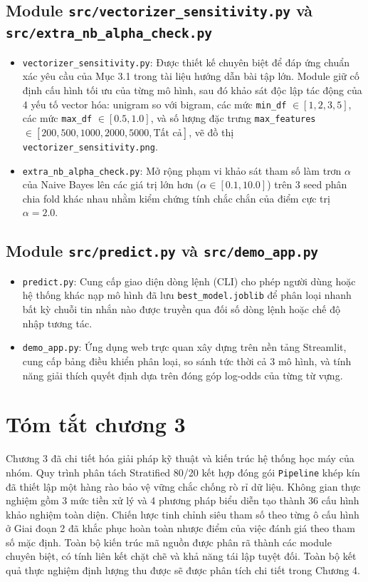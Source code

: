 \subsection{Module \texttt{src/vectorizer\_sensitivity.py} và \texttt{src/extra\_nb\_alpha\_check.py}}
\begin{itemize}
    \item \texttt{vectorizer\_sensitivity.py}: Được thiết kế chuyên biệt để đáp ứng chuẩn xác yêu cầu của Mục 3.1 trong tài liệu hướng dẫn bài tập lớn. Module giữ cố định cấu hình tối ưu của từng mô hình, sau đó khảo sát độc lập tác động của 4 yếu tố vector hóa: unigram so với bigram, các mức \texttt{min\_df} $\in [1, 2, 3, 5]$, các mức \texttt{max\_df} $\in [0.5, 1.0]$, và số lượng đặc trưng \texttt{max\_features} $\in [200, 500, 1000, 2000, 5000, \text{Tất cả}]$, vẽ đồ thị \texttt{vectorizer\_sensitivity.png}.
    \item \texttt{extra\_nb\_alpha\_check.py}: Mở rộng phạm vi khảo sát tham số làm trơn $\alpha$ của Naive Bayes lên các giá trị lớn hơn ($\alpha \in [0.1, 10.0]$) trên 3 seed phân chia fold khác nhau nhằm kiểm chứng tính chắc chắn của điểm cực trị $\alpha = 2.0$.
\end{itemize}

\subsection{Module \texttt{src/predict.py} và \texttt{src/demo\_app.py}}
\begin{itemize}
    \item \texttt{predict.py}: Cung cấp giao diện dòng lệnh (CLI) cho phép người dùng hoặc hệ thống khác nạp mô hình đã lưu \texttt{best\_model.joblib} để phân loại nhanh bất kỳ chuỗi tin nhắn nào được truyền qua đối số dòng lệnh hoặc chế độ nhập tương tác.
    \item \texttt{demo\_app.py}: Ứng dụng web trực quan xây dựng trên nền tảng Streamlit, cung cấp bảng điều khiển phân loại, so sánh tức thời cả 3 mô hình, và tính năng giải thích quyết định dựa trên đóng góp log-odds của từng từ vựng.
\end{itemize}

\section{Tóm tắt chương 3}
Chương 3 đã chi tiết hóa giải pháp kỹ thuật và kiến trúc hệ thống học máy của nhóm. Quy trình phân tách Stratified 80/20 kết hợp đóng gói \texttt{Pipeline} khép kín đã thiết lập một hàng rào bảo vệ vững chắc chống rò rỉ dữ liệu. Không gian thực nghiệm gồm 3 mức tiền xử lý và 4 phương pháp biểu diễn tạo thành 36 cấu hình khảo nghiệm toàn diện. Chiến lược tinh chỉnh siêu tham số theo từng ô cấu hình ở Giai đoạn 2 đã khắc phục hoàn toàn nhược điểm của việc đánh giá theo tham số mặc định. Toàn bộ kiến trúc mã nguồn được phân rã thành các module chuyên biệt, có tính liên kết chặt chẽ và khả năng tái lập tuyệt đối. Toàn bộ kết quả thực nghiệm định lượng thu được sẽ được phân tích chi tiết trong Chương 4.
